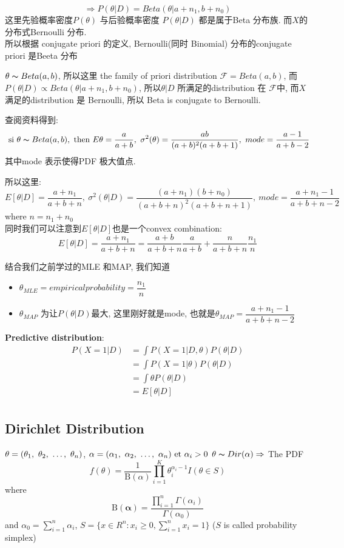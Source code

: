 \documentclass{article}
\begin{document}
$$\Rightarrow P(\theta | D) = Beta(\theta | a + n_1, b + n_0)$$
这里先验概率密度$P(\theta)$ 与后验概率密度 $P(\theta|D)$ 都是属于Beta 分布族. 而$X$的分布式Bernoulli 分布.\\
所以根据 conjugate priori 的定义, Bernoulli(同时 Binomial) 分布的conjugate priori 是Beeta 分布

$\theta \thicksim{B}eta(a,b)$, 所以这里 the family of priori distribution $\mathcal{F} = Beta(a,b)$, 
而$P(\theta | D) \propto Beta(\theta | a + n_1, b + n_0)$, 所以$\theta|D$ 所满足的distribution 在 $\mathcal{F}$中, 而$X$ 满足的distribution 是 Bernoulli,
所以 Beta is conjugate to Bernoulli.

查阅资料得到:\\
$$\textrm{\ si } \theta \thicksim{B}eta(a,b), \textrm{ then } E\theta = \dfrac{a}{a+b},\ \sigma^2(\theta) = \dfrac{ab}{(a+b)^2(a+b+1)},\ mode = \dfrac{a-1}{a+b-2}$$
其中mode 表示使得PDF 极大值点.

所以这里:
$$E[\theta|D] = \dfrac{a + n_1}{a + b + n},\ \sigma^2(\theta|D) = \dfrac{(a + n_1)(b + n_0) }{(a + b + n)^2(a +b + n +1)},\ mode = \dfrac{a + n_1 -1}{a + b + n -2}$$
where $n = n_1 + n_0$\\
同时我们可以注意到$E[\theta|D]$也是一个convex combination:
$$E[\theta|D] = \dfrac{a + n_1}{a + b +n} = \dfrac{a+b}{a+b+n} \dfrac{a}{a+b} + \dfrac{n}{a+b+n} \dfrac{n_1}{n}$$

结合我们之前学过的MLE 和MAP, 我们知道
\begin{itemize}
\item $\theta_{MLE} = empirical probability = \dfrac{n_1}{n}$
\item $\theta_{MAP}$ 为让$P(\theta|D)$最大, 这里刚好就是mode, 也就是$\theta_{MAP} = \dfrac{a+n_1 - 1}{a+b+n-2}$
\end{itemize}

\textbf{Predictive distribution}:\\
$$
\begin{aligned}
P(X=1|D) 
& = \int P(X=1|D,\theta) P(\theta|D) \\
& = \int P(X=1|\theta) P(\theta|D) \\
& = \int \theta P(\theta|D) \\
& = E[\theta|D]\\
\end{aligned}
$$

\subsection{Dirichlet Distribution}
$\theta = (\theta_1,~\theta_2,~\ldots,~\theta_n)$, $\alpha = (\alpha_1,~\alpha_2,~\ldots,~\alpha_n) \textrm{\ et } \alpha_i > 0$
$\theta \thicksim{D}ir(\alpha) \Rightarrow$ 
The PDF
$$ f(\theta) = \frac{1}{\mathrm{B}(\alpha)} \prod_{i=1}^K \theta_i^{\alpha_i - 1} I(\theta \in S) $$
where
$$
\mathrm{B}(\boldsymbol\alpha) 
= \frac{\prod_{i=1}^n \Gamma(\alpha_i)}{\Gamma(\alpha_0)}
$$
and 
$\alpha_0 = \sum_{i=1}^n \alpha_i$, 
$S = \{x \in R^n: x_i \geq 0, \sum_{i=1}^n x_i = 1\}$ ($S$ is called probability simplex)
\end{document}
